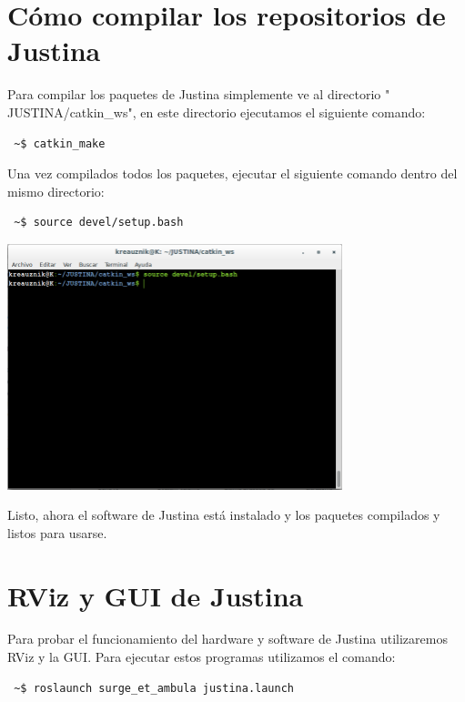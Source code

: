 \documentclass[user_manual.tex]{subfiles}
\begin{document}
\section{Cómo compilar los repositorios de Justina}
Para compilar los paquetes de Justina simplemente ve al directorio " JUSTINA/catkin\_ws", en este directorio ejecutamos el siguiente comando: 

\begin{verbatim}
 ~$ catkin_make
\end{verbatim}

Una vez compilados todos los paquetes, ejecutar el siguiente comando dentro del mismo directorio:

\begin{verbatim}
 ~$ source devel/setup.bash
\end{verbatim}

 \begin{center}
\includegraphics[width=0.73\textwidth]{Figures/PP/pp5.png}
\end{center}

Listo, ahora el software de Justina está instalado y los paquetes compilados y listos para usarse.

\section{RViz y GUI de Justina}
Para probar el funcionamiento del hardware y software de Justina utilizaremos RViz y la GUI. Para ejecutar estos programas utilizamos el 
comando:

\begin{verbatim}
 ~$ roslaunch surge_et_ambula justina.launch
\end{verbatim}
\end{document}
